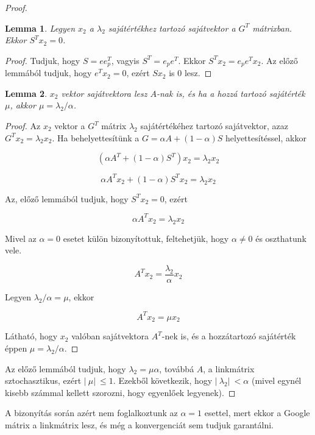 \documentclass[12pt,a4paper]{article}
\newtheorem{lemma}{Lemma}
\begin{document}
\begin{proof}
	\begin{lemma}
		Legyen $x_2$ a $\lambda_2$ sajátértékhez tartozó sajátvektor a $G^T$ mátrixban. Ekkor $S^T x_2 = 0$.
	\end{lemma}
	\begin{proof}
		Tudjuk, hogy $S = e e_p^T$, vagyis $S^T = e_p e^T$. Ekkor $S^T x_2 = e_p e^T x_2$. Az előző lemmából tudjuk, hogy $e^T x_2 = 0$, ezért $S x_2$ is 0 lesz.
		\phantom\qedhere
	\end{proof}
	
	\begin{lemma}
		$x_2$ vektor sajátvektora lesz $A$-nak is, és ha a hozzá tartozó sajátérték $\mu$, akkor $\mu = \lambda_2 / \alpha$. 
	\end{lemma}
    \begin{proof}
    	Az $x_2$ vektor a $G^T$ mátrix $\lambda_2$ sajátértékéhez tartozó sajátvektor, azaz $G^T x_2 = \lambda_2 x_2$. Ha behelyettesítünk a $G = \alpha A + (1-\alpha)S$ helyettesítéssel, akkor
    	
    	\[ (\alpha A^T + (1-\alpha) S^T ) x_2 = \lambda_2 x_2 \]
    	
    	\[ \alpha A^T x_2 + (1-\alpha) S^T x_2 = \lambda_2 x_2 \]
    	 
    	Az, előző lemmából tudjuk, hogy $S^T x_2 = 0$, ezért 
    	
    	\[ \alpha A^T x_2 = \lambda_2 x_2 \]
    	
    	Mivel az $\alpha = 0$ esetet külön bizonyítottuk, feltehetjük, hogy $\alpha \neq 0$ és oszthatunk vele.
    	
    	\[ A^T x_2 = \frac{\lambda_2}{\alpha} x_2 \]
    	 
    	Legyen $\lambda_2/\alpha = \mu$, ekkor
    	 
    	\[ A^T x_2 = \mu x_2 \]
    	
    	Látható, hogy $x_2$ valóban sajátvektora $A^T$-nek is, és a hozzátartozó sajátérték éppen $\mu = \lambda_2/\alpha$.
    	\phantom\qedhere
    \end{proof}
	
	Az előző lemmából tudjuk, hogy $\lambda_2 = \mu \alpha$, továbbá $A$, a linkmátrix sztochasztikus, ezért $|\ \mu |\ \leq 1$. Ezekből következik, hogy $ |\ \lambda_2 |\ < \alpha $ (mivel egynél kisebb számmal kellett szorozni, hogy egyenlőek legyenek).
\end{proof}

A bizonyítás során azért nem foglalkoztunk az $\alpha = 1$ esettel, mert ekkor a Google mátrix a linkmátrix lesz, és még a konvergenciát sem tudjuk garantálni.
\end{document}
